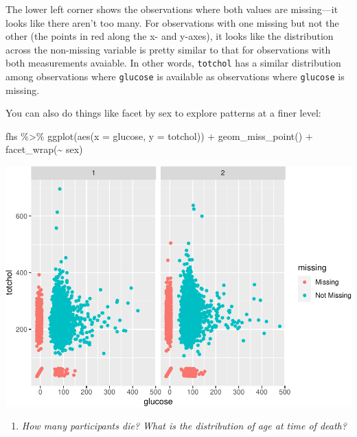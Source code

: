\documentclass[
]{book}
\newenvironment{Shaded}{\begin{snugshade}}{\end{snugshade}}
\newcommand{\AttributeTok}[1]{\textcolor[rgb]{0.77,0.63,0.00}{#1}}
\newcommand{\FunctionTok}[1]{\textcolor[rgb]{0.00,0.00,0.00}{#1}}
\newcommand{\NormalTok}[1]{#1}
\newcommand{\SpecialCharTok}[1]{\textcolor[rgb]{0.00,0.00,0.00}{#1}}
\providecommand{\tightlist}{%
  \setlength{\itemsep}{0pt}\setlength{\parskip}{0pt}}
\begin{document}
The lower left corner shows the observations where both values are missing---it
looks like there aren't too many. For observations with one missing but not the
other (the points in red along the x- and y-axes), it looks like the distribution
across the non-missing variable is pretty similar to that for observations
with both measurements avaiable. In other words, \texttt{totchol} has a similar
distribution among observations where \texttt{glucose} is available as observations
where \texttt{glucose} is missing.

You can also do things like facet by sex to explore patterns at a finer level:

\begin{Shaded}
\begin{Highlighting}[]
\NormalTok{fhs }\SpecialCharTok{\%\textgreater{}\%} 
  \FunctionTok{ggplot}\NormalTok{(}\FunctionTok{aes}\NormalTok{(}\AttributeTok{x =}\NormalTok{ glucose, }\AttributeTok{y =}\NormalTok{ totchol)) }\SpecialCharTok{+} 
  \FunctionTok{geom\_miss\_point}\NormalTok{() }\SpecialCharTok{+} 
  \FunctionTok{facet\_wrap}\NormalTok{(}\SpecialCharTok{\textasciitilde{}}\NormalTok{ sex)}
\end{Highlighting}
\end{Shaded}

\includegraphics{adv_epi_analysis_files/figure-latex/unnamed-chunk-79-1.pdf}

\begin{enumerate}
\def\labelenumi{\arabic{enumi}.}
\setcounter{enumi}{2}
\tightlist
\item
  \emph{How many participants die? What is the distribution of age at time of death?}
\end{enumerate}
\end{document}
